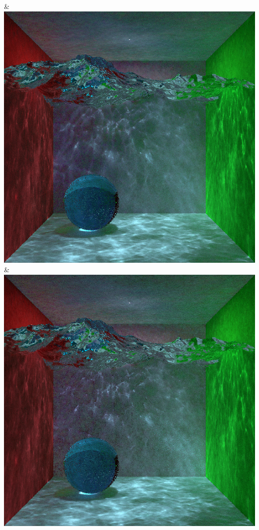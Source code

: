 & \includegraphics[width=\linewidth]{figures/py/tests/sppc_optimization/nrc+sppc+Rej70_1spp_caustics_small.png}
& \includegraphics[width=\linewidth]{figures/py/tests/sppc_optimization/nrc+sppc+Rej70+RejN_1spp_caustics_small.png}
